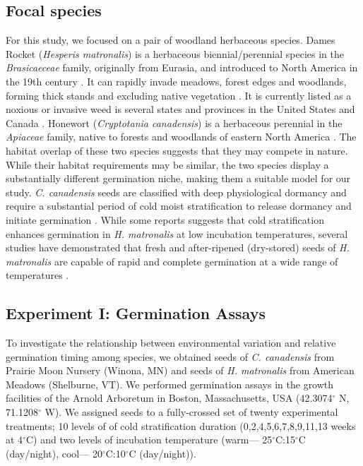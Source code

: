 \documentclass{article}[11pt]
\begin{document}
\subsection*{Focal species}
 For this study, we focused on a pair of woodland herbaceous species. Dames Rocket (\textit{Hesperis matronalis}) is a herbaceous biennial/perennial species in the \textit{Brasicaeceae} family, originally from Eurasia, and introduced to North America in the 19th century \citep{Francis:2009wz}. It  can rapidly invade  meadows, forest edges and woodlands, forming thick stands and excluding native vegetation \citep{Francis:2009wz}. It is currently listed as a noxious or invasive weed is several states and provinces in the United States and Canada \citep{Susko:2008ut}. Honewort (\textit{Cryptotania canadensis}) is a herbaceous perennial in the \textit{Apiaceae} family, native to forests and woodlands of eastern North America \citep{Hawkins:2007vb}. The  habitat overlap of these two species suggests that they may compete in nature. While their habitat requirements may be similar, the two species display a substantially different germination niche, making them a suitable model for our study. \textit{C. canadensis} seeds are classified with deep physiological dormancy and require a substantial period of cold moist stratification to release dormancy and initiate germination \citep{Baskin:1988um}. While some reports suggests that cold stratification enhances germination in \textit{H. matronalis} at low incubation temperatures, several studies have demonstrated that fresh and after-ripened (dry-stored) seeds of \textit{H. matronalis} are capable of rapid and complete germination at a wide range of temperatures \citep{Susko:2008ut}. %

\subsection*{Experiment I: Germination Assays}
To investigate the relationship between environmental variation and relative germination timing among species, we obtained seeds of \textit{C. canadensis} from Prairie Moon Nursery (Winona, MN) and seeds of \textit{H. matronalis} from American Meadows (Shelburne, VT). %
We performed germination assays in the growth facilities of the Arnold Arboretum in Boston, Massachusetts, USA (42.3074$^{\circ}$ N, 71.1208$^{\circ}$ W). We assigned seeds to a fully-crossed set of twenty experimental treatments; 10 levels of of cold stratification duration (0,2,4,5,6,7,8,9,11,13 weeks at 4$^{\circ}$C) and two levels of incubation temperature (warm--- 25$^{\circ}$C:15$^{\circ}$C (day/night), cool--- 20$^{\circ}$C:10$^{\circ}$C (day/night)).
\end{document}
